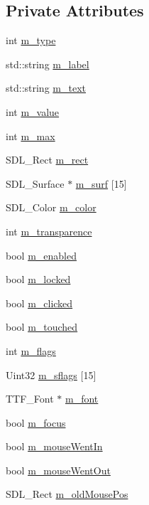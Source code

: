 \subsection*{Private Attributes}
\begin{DoxyCompactItemize}
\item 
int \hyperlink{classsanform_a9484561aac203c57d567fc30555509cd}{m\+\_\+type}
\item 
std\+::string \hyperlink{classsanform_ad132cfac5ff2edf8495e6a816f955df7}{m\+\_\+label}
\item 
std\+::string \hyperlink{classsanform_a59573a3b7e037372cce0297beb240a37}{m\+\_\+text}
\item 
int \hyperlink{classsanform_a16b166bcc39b80caa93a7255d4f10a53}{m\+\_\+value}
\item 
int \hyperlink{classsanform_a7a6e43be4f348e2455a3e5c4e648f807}{m\+\_\+max}
\item 
S\+D\+L\+\_\+\+Rect \hyperlink{classsanform_a650ae5af624623f69dbd3d9f5718324f}{m\+\_\+rect}
\item 
S\+D\+L\+\_\+\+Surface $\ast$ \hyperlink{classsanform_abbfea3f8de952e436773c882214dc7ba}{m\+\_\+surf} \mbox{[}15\mbox{]}
\item 
S\+D\+L\+\_\+\+Color \hyperlink{classsanform_af56503a17f76847a65478a5d57b348a3}{m\+\_\+color}
\item 
int \hyperlink{classsanform_add52c554899fe973fa4f4ccfb6652ef8}{m\+\_\+transparence}
\item 
bool \hyperlink{classsanform_a5187105a96c46242bed4a3247075e0cd}{m\+\_\+enabled}
\item 
bool \hyperlink{classsanform_a6eb43bbcab0537171fca3fe88127030f}{m\+\_\+locked}
\item 
bool \hyperlink{classsanform_a02c6d5cb8db4d5f7a07a87abdeaf0d76}{m\+\_\+clicked}
\item 
bool \hyperlink{classsanform_a67dcedbe6a3f7cb18d2f9d627b53ef1c}{m\+\_\+touched}
\item 
int \hyperlink{classsanform_a0094b6b0e4411b936e8a13226500b4d2}{m\+\_\+flags}
\item 
Uint32 \hyperlink{classsanform_a5a1f4b0d4c8d915b7b6ca0a633f48216}{m\+\_\+sflags} \mbox{[}15\mbox{]}
\item 
T\+T\+F\+\_\+\+Font $\ast$ \hyperlink{classsanform_aa30a150d547d4783b3f8558f6727c467}{m\+\_\+font}
\item 
bool \hyperlink{classsanform_a41ba5ba91ae765354c620d86057fdfa2}{m\+\_\+focus}
\item 
bool \hyperlink{classsanform_a2be3580e324c2dc6c6597862bae1b3b7}{m\+\_\+mouse\+Went\+In}
\item 
bool \hyperlink{classsanform_ae78e2a37567202e490362d3c076c4b1d}{m\+\_\+mouse\+Went\+Out}
\item 
S\+D\+L\+\_\+\+Rect \hyperlink{classsanform_a83b61c0f4328536eadee6fd63cebed5a}{m\+\_\+old\+Mouse\+Pos}
\end{DoxyCompactItemize}


